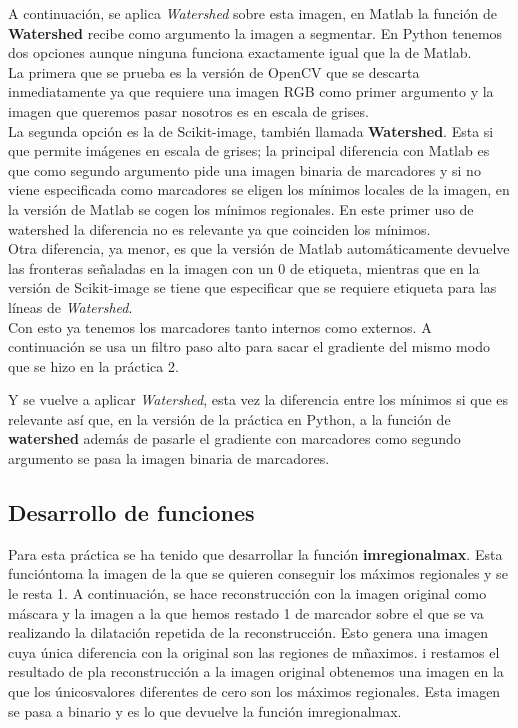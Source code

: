 \documentclass[a4paper,12pt]{report}
\begin{document}
A continuación, se aplica \emph{Watershed} sobre esta imagen, en Matlab la función de \textbf{Watershed} recibe como argumento la imagen a segmentar. En Python tenemos dos opciones aunque ninguna funciona exactamente igual que la de Matlab.\\

La primera que se prueba es la versión de OpenCV que se descarta inmediatamente ya que requiere una imagen RGB como primer argumento y la imagen que queremos pasar nosotros es en escala de grises.\\

La segunda opción es la de Scikit-image, también llamada \textbf{Watershed}. Esta si que permite imágenes en escala de grises; la principal diferencia con Matlab es que como segundo argumento pide una imagen binaria de marcadores y si no viene especificada como marcadores se eligen los mínimos locales de la imagen, en la versión de Matlab se cogen los mínimos regionales. En este primer uso de watershed la diferencia no es relevante ya que coinciden los mínimos.\\

 Otra diferencia, ya menor, es que la versión de Matlab automáticamente devuelve las fronteras señaladas en la imagen con un 0 de etiqueta, mientras que en la versión de Scikit-image se tiene que especificar que se requiere etiqueta para las líneas de \emph{Watershed}.\\

Con esto ya tenemos los marcadores tanto internos como externos. A continuación se usa un filtro paso alto para sacar el gradiente del mismo modo que se hizo en la práctica 2. 

Y se vuelve a aplicar  \emph{Watershed}, esta vez la diferencia entre los mínimos si que es relevante así que, en la versión de la práctica en Python, a la función de \textbf{watershed} además de pasarle el gradiente con marcadores como segundo argumento se pasa la imagen binaria de marcadores.\\


\subsection{Desarrollo de funciones}

Para esta práctica se ha tenido que desarrollar la función \textbf{imregionalmax}. Esta funcióntoma la imagen de la que se quieren conseguir los máximos regionales y se le resta 1. A continuación, se hace reconstrucción con la imagen original como máscara y la imagen a la que hemos restado 1 de marcador sobre el que se va realizando la dilatación repetida de la reconstrucción. Esto genera una imagen cuya única diferencia con la original son las regiones de mñaximos. i restamos el resultado de pla reconstrucción a la imagen original obtenemos una imagen en la que los únicosvalores diferentes de cero son los máximos regionales. Esta imagen se pasa a binario y es lo que devuelve la función imregionalmax.
\end{document}
